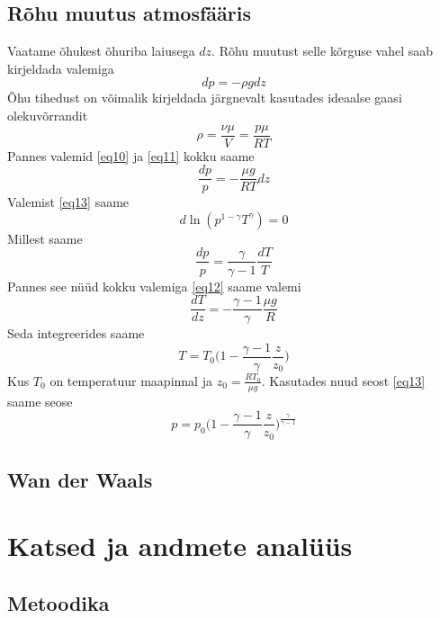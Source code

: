 \documentclass{trkut}%
\begin{document}
\section{Rõhu muutus atmosfääris}
Vaatame õhukest õhuriba laiusega $dz$. Rõhu muutust selle kõrguse vahel saab kirjeldada valemiga
\begin{equation}\label{eq10}
dp=-\rho gdz
\end{equation}
Õhu tihedust on võimalik kirjeldada järgnevalt kasutades ideaalse gaasi olekuvõrrandit
\begin{equation}\label{eq11}
\rho = \frac{\nu \mu}{V} = \frac{p \mu}{RT}
\end{equation}
Pannes valemid \ref{eq10} ja \ref{eq11} kokku saame
\begin{equation}\label{eq12}
\frac{dp}{p} = -\frac{\mu g}{RT}dz
\end{equation}
Valemist \ref{eq13} saame
\begin{equation}
d\ln(p^{1-\gamma}T^\gamma) = 0
\end{equation}
Millest saame
\begin{equation}
\frac{dp}{p} = \frac{\gamma}{\gamma-1}\frac{dT}{T}
\end{equation}
Pannes see nüüd kokku valemiga \ref{eq12} saame valemi
\begin{equation}
\frac{dT}{dz}=-\frac{\gamma-1}{\gamma} \frac{\mu g}{R}
\end{equation}
Seda integreerides saame
\begin{equation}
T=T_0 \bigg( 1-\frac{\gamma-1}{\gamma} \frac{z}{z_0} \bigg)
\end{equation}
Kus $T_0$ on temperatuur maapinnal ja $z_0 = \frac{RT_0}{\mu g} $. Kasutades nuud seost \ref{eq13} saame seose
\begin{equation}
p = p_0 \bigg( 1-\frac{\gamma-1}{\gamma} \frac{z}{z_0} \bigg)^\frac{\gamma}{\gamma-1}
\end{equation}

\section{Wan der Waals}

\chapter{Katsed ja andmete analüüs}
\section{Metoodika}
\end{document}
